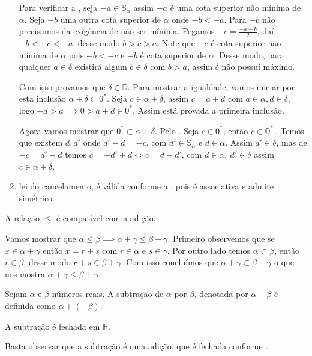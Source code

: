 \documentclass[../main.tex]{subfiles}
\begin{document}
\begin{dem}
\begin{enumerate}[label=(\roman*)]
            Para verificar a , seja $-a \in \mathbb{S}_{\alpha}$ assim $-a$ é uma cota superior não mínima de $\alpha$. Seja $-b$ uma outra cota superior de $\alpha$ onde $-b < -a$. Para $-b$ não precisamos da exigência de não ser mínima. Pegamos $-c = \frac{-a-b}{2}$, daí $-b < -c < -a$, desse modo $b > c > a$. Note que $-c$ é cota superior não mínima de $\alpha$ pois $-b < -c$ e $-b$ é cota superior de $\alpha$. Desse modo, para qualquer $a \in \delta$ existirá algum $b \in \delta$ com $b > a$, assim $\delta$ não possuí máximo.

            Com isso provamos que $\delta \in \mathbb{R}$. Para mostrar a igualdade, vamos iniciar por esta inclusão $\alpha + \delta \subset 0^*$. 
            Seja $c \in \alpha + \delta$, assim $c = a + d$ com $a \in \alpha, d \in \delta$, logo $-d > a \implies 0 > a + d \in 0^*$. Assim está provada a primeira inclusão. 

            Agora vamos mostrar que $0^* \subset \alpha + \delta$. Pelo .
            Seja $c \in 0^*$, então $c \in \mathbb{Q}_{-}^*$. Temos que existem $d, d'$ onde $d'-d = -c$, com $d' \in \mathbb{S}_{\alpha}$ e $d \in \alpha$. Assim $d' \in \delta$, mas de $-c = d' - d$ temos $c = -d' + d \iff c = d -d'$, com $d \in \alpha,\ d' \in \delta$ assim $c \in \alpha + \delta$.
            
        \item lei do cancelamento, é válida conforme a , pois é associativa e admite simétrico.

    \end{enumerate}
\end{dem}


\begin{prop}\label{reais-prop-adicaoCompativelOrdem}
    A relação $\leq$ é compatível com a adição.
\end{prop}
\begin{dem}
    Vamos mostrar que $\alpha \leq \beta \implies \alpha + \gamma \leq \beta + \gamma$.
    Primeiro observemos que se $x \in \alpha + \gamma$ então $x = r + s$ com $r \in \alpha$ e $s \in \gamma$. Por outro lado temos $\alpha \subset \beta$, então $r \in \beta$, desse modo $r + s \in \beta + \gamma$. Com isso concluímos que $\alpha + \gamma \subset \beta + \gamma$ o que nos mostra $\alpha + \gamma \leq \beta + \gamma$.
\end{dem}
\begin{defi}
    Sejam $\alpha$ e $\beta$ números reais. A subtração de $\alpha$ por $\beta$, denotada por $\alpha - \beta$ é definida como $\alpha + (-\beta)$.
\end{defi}
\begin{prop}
    A subtração é fechada em $\mathbb{R}$.
\end{prop}
\begin{dem}
    Basta observar que a subtração é uma adição, que é fechada conforme .
\end{dem}
\end{document}
